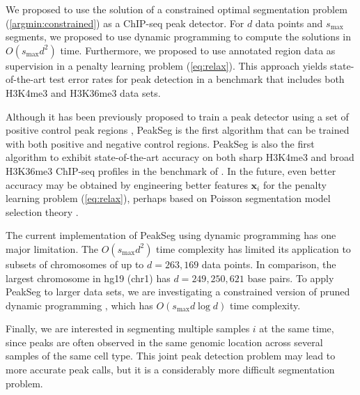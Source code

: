 \documentclass{article}
\begin{document}
We proposed to use the solution of a constrained optimal segmentation
problem (\ref{argmin:constrained}) as a ChIP-seq peak detector. For
$d$ data points and $s_{\text{max}}$ segments, we proposed to use
dynamic programming to compute the solutions in $O(s_{\text{max}} d^2)$
time. Furthermore, we proposed to use annotated region data as
supervision in a penalty learning problem (\ref{eq:relax}). This
approach yields state-of-the-art test error rates for peak detection
in a benchmark that includes both H3K4me3 and H3K36me3 data
sets.

Although it has been previously proposed to train a peak detector
using a set of positive control peak regions \citep{DFilter}, PeakSeg
is the first algorithm that can be trained with both positive and
negative control regions. PeakSeg is also the first algorithm to
exhibit state-of-the-art accuracy on both sharp H3K4me3 and broad
H3K36me3 ChIP-seq profiles in the benchmark of
\citet{hocking2014visual}. In the future, even better accuracy may be
obtained by engineering better features $\mathbf x_i$ for the penalty
learning problem (\ref{eq:relax}), perhaps based on Poisson
segmentation model selection theory \citep{cleynen2013segmentation}.

The current implementation of PeakSeg using dynamic programming has
one major limitation. The $O(s_{\text{max}} d^2)$ time complexity has
limited its application to subsets of chromosomes of up to $d=263,169$
data points. In comparison, the largest chromosome in hg19 (chr1) has
$d=249,250,621$ base pairs. To apply PeakSeg to larger data sets, we
are investigating a constrained version of pruned dynamic programming
\citep{pruned-dp, Segmentor}, which has $O(s_{\text{max}} d\log d)$
time complexity.

Finally, we are interested in segmenting multiple samples $i$ at the
same time, since peaks are often observed in the same genomic location
across several samples of the same cell type. This joint peak
detection problem may lead to more accurate peak calls, but it is a
considerably more difficult segmentation problem.




\end{document}
